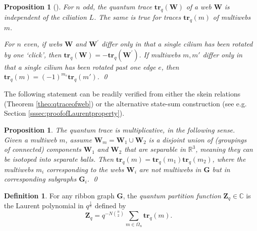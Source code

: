 \documentclass[12pt, reqno]{amsart}
\newtheorem{prop}[theo]{Proposition}
\theoremstyle{definition}
\newtheorem{defi}[theo]{Definition}
\newcommand{\Zq}{\mathbf{Z}_q}%
\newcommand{\R}{\mathbb{R}}%
\newcommand{\trq}{\mathbf{tr}_q}%
\begin{document}
\begin{prop}[\cite{sikora1}]\label{prop:ciliadependence}
For $n$ odd, the quantum trace $\trq(\mathbf{W})$ of a web $\mathbf{W}$ is independent of the ciliation $L$.  The same is true for traces $\trq(m)$ of multiwebs $m$.

For $n$ even, if webs $\mathbf{W}$ and $\mathbf{W}^\prime$ differ only in that a single cilium has been rotated by one `click', then $\trq(\mathbf{W})=-\trq(\mathbf{W}^\prime)$.  If multiwebs $m,m'$ differ only in that a single cilium has been rotated past one edge $e$, then $\trq(m)=(-1)^{m_e}\trq(m')$.  
\qed\end{prop}

The following statement can be readily verified from either the skein relations (Theorem \ref{theo:qtraceofweb}) or the alternative state-sum construction (see e.g. Section \ref{sssec:proofofLaurentproperty}).

\begin{prop}\label{prop:multiplicative}
The quantum trace is multiplicative, in the following sense.  Given a multiweb $m$, assume $\mathbf{W}_m=\mathbf{W}_1\cup\mathbf{W}_2$ is a disjoint union of (groupings of connected) components $\mathbf{W}_1$ and $\mathbf{W}_2$ that are separable in $\R^3$, meaning they can be isotoped into separate balls.  Then $\trq(m)=\trq(m_1)\trq(m_2)$, where the multiwebs $m_i$ corresponding to the webs $\mathbf{W}_i$ are not multiwebs in $\mathbf{G}$ but in corresponding subgraphs $\mathbf{G}_i$.
\qed\end{prop}

\begin{defi}
For any ribbon graph $\mathbf{G}$, the  \emph{quantum partition function} $\Zq\in\mathbb{C}$ is the Laurent polynomial in $q^\frac{1}{n}$ defined by
$$
\Zq=q^{-N\binom{n}{2}}\sum_{m\in\Omega_n} \trq(m).
$$
\end{defi}
\end{document}
